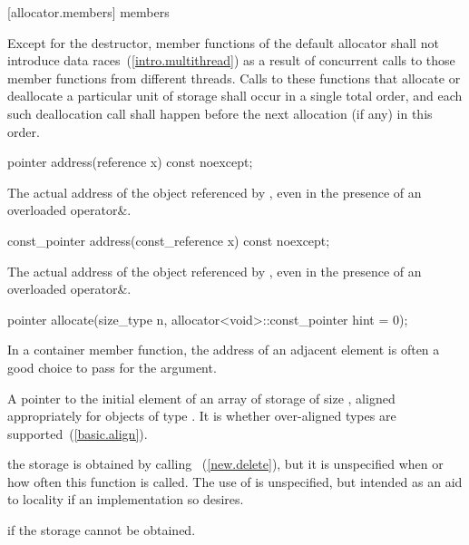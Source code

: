 [allocator.members]{ members}

\pnum
Except for the destructor, member functions of the default allocator shall not introduce
data races~(\ref{intro.multithread}) as a result of concurrent calls to those member
functions from different threads. Calls to these functions that allocate or deallocate a
particular unit of storage shall occur in a single total order, and each such
deallocation call shall happen before the next allocation (if any) in this order.

\begin{itemdecl}
pointer address(reference x) const noexcept;
\end{itemdecl}

\begin{itemdescr}
\pnum
\returns
The actual address of the object referenced by , even in the presence of an
overloaded operator\&.
\end{itemdescr}

\begin{itemdecl}
const_pointer address(const_reference x) const noexcept;
\end{itemdecl}

\begin{itemdescr}
\pnum
\returns
The actual address of the object referenced by , even in the presence of an
overloaded operator\&.
\end{itemdescr}

\begin{itemdecl}
pointer allocate(size_type n, allocator<void>::const_pointer hint = 0);
\end{itemdecl}

\begin{itemdescr}
\pnum
\enternote In a container member function, the address of an adjacent
element is often a good choice to pass for the  argument. \exitnote

\pnum
\returns
A pointer to the initial element of an array of storage of size 
, aligned appropriately for objects of type .
It is  whether over-aligned types are
supported~(\ref{basic.align}).

\pnum
\remark
the storage is obtained by calling ~(\ref{new.delete}), but it is unspecified when or how often this
function is called. The use of  is unspecified, but intended as an aid to
locality if an implementation so desires.

\pnum
\throws
{} if the storage cannot be obtained.
\end{itemdescr}

